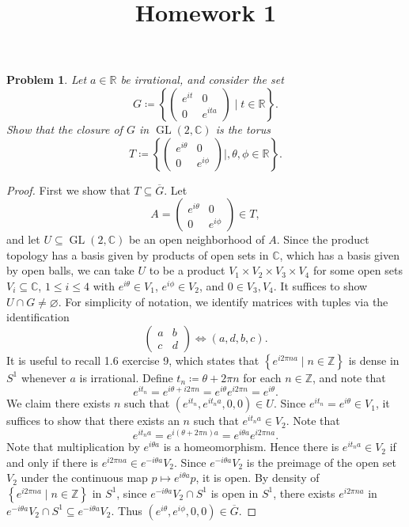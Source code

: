 \documentclass[11pt, letterpaper]{article}
\title{Homework 1}
\theoremstyle{plain}
\newtheorem{problem}{Problem}
\begin{document}
\makeproblem
\begin{problem}
	Let $a\in\mathbb{R} $ be irrational, and consider the set
	\[
		G\coloneqq \left\{ \begin{pmatrix}
		e^{it}  & 0 \\
		0 & e^{ita} 
		\end{pmatrix}\mid t\in\mathbb{R}  \right\} 
	.\]
	Show that the closure of $G$ in $\operatorname{GL} (2,\mathbb{C} )$ is the torus
	\[
		T\coloneqq \left\{ \begin{pmatrix}
		e^{i\theta }  & 0 \\
		0 & e^{i\phi } 
		\end{pmatrix}\mid ,\theta ,\phi \in\mathbb{R}  \right\} 
	.\]
\end{problem}
\begin{proof}
	First we show that $T\subseteq \overline{G} $. Let 
	$$A=\begin{pmatrix}
	e^{i\theta }  & 0 \\
	0 & e^{i\phi } 
	\end{pmatrix}\in T,$$
	and let $U\subseteq \operatorname{GL} (2,\mathbb{C} )$ be an open neighborhood of $A$. Since the product topology has a basis given by products of open sets in $\mathbb{C} $, which has a basis given by open balls, we can take $U$ to be a product $V_1\times V_2\times V_3\times V_4$ for some open sets $V_i\subseteq \mathbb{C} $, $1\leq i\leq 4$ with $e^{i\theta } \in V_1$, $e^{i\phi } \in V_2$, and $0\in V_3,V_4$. It suffices to show $U \cap G \neq \varnothing $. For simplicity of notation, we identify matrices with tuples via the identification
	\[
		\begin{pmatrix}
		a & b \\
		c & d
		\end{pmatrix}\iff (a,d,b,c)
	.\]
	It is useful to recall \cite{hall} 1.6 exercise 9, which states that $\left\{ e^{i2\pi na} \mid n\in\mathbb{Z}  \right\} $ is dense in $S^1$ whenever $a$ is irrational. Define $t_n \coloneqq \theta +2\pi n$ for each $n\in\mathbb{Z} $, and note that
	\[
		e^{it_n} =e^{i\theta +i2\pi n} =e^{i\theta } e^{i2\pi n} =e^{i\theta } 
	.\]
	We claim there exists $n$ such that $(e^{it_n} ,e^{it_na} ,0,0)\in U$. Since $e^{it_n} =e^{i\theta } \in V_1$, it suffices to show that there exists an $n$ such that $e^{it_na} \in V_2$. Note that
	\[
		e^{it_na} =e^{i(\theta +2\pi n)a} =e^{i\theta a} e^{i2\pi na} 
	.\]
	Note that multiplication by $e^{i\theta a} $ is a homeomorphism. Hence there is $e^{it_na} \in V_2$ if and only if there is $e^{i2\pi na} \in e^{-i\theta a} V_2$. Since $e^{-i\theta a} V_2$ is the preimage of the open set $V_2$ under the continuous map $p\mapsto e^{i\theta a} p$, it is open. By density of $\left\{ e^{i2\pi na} \mid n\in\mathbb{Z}  \right\} $ in $S^1$, since $e^{-i\theta a} V_2 \cap S^1$ is open in $S^1$, there exists $e^{i2\pi na} $ in $e^{-i\theta a} V_2 \cap S^1 \subseteq e^{-i\theta a}V_2$. Thus $(e^{i\theta } ,e^{i\phi } ,0,0)\in \overline{G} $.


\end{proof}
\end{document}
